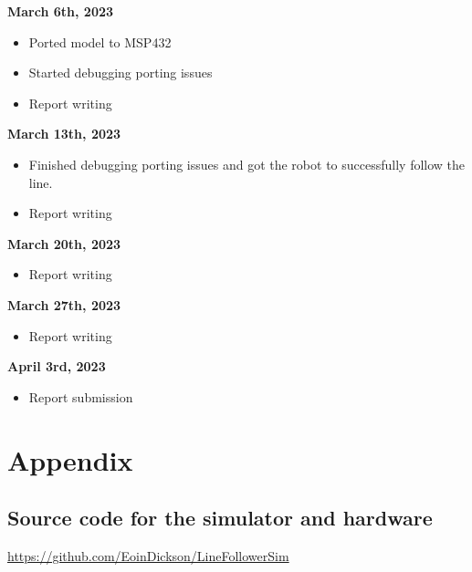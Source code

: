 \documentclass[a4paper,12pt]{article}
\begin{document}
\textbf{\large March 6th, 2023}
\begin{itemize}
  \item Ported model to MSP432 
  \item Started debugging porting issues
  \item Report writing 


\end{itemize}
\vspace{.7cm}
\textbf{\large March 13th, 2023}
\begin{itemize}
  \item Finished debugging porting issues and got the robot to successfully follow the line. 
  \item Report writing 

\end{itemize}
\vspace{.7cm}
\textbf{\large March 20th, 2023}
\begin{itemize}
  \item Report writing 


\end{itemize}
\vspace{.7cm}
\textbf{\large March 27th, 2023}
\begin{itemize}
  \item Report writing 


\end{itemize}
\vspace{.7cm}
\textbf{\large April 3rd, 2023}
\begin{itemize}
  \item Report submission 


\end{itemize}

\pagebreak
\section{Appendix}
\subsection{Source code for the simulator and hardware}
\url{https://github.com/EoinDickson/LineFollowerSim}
\end{document}
